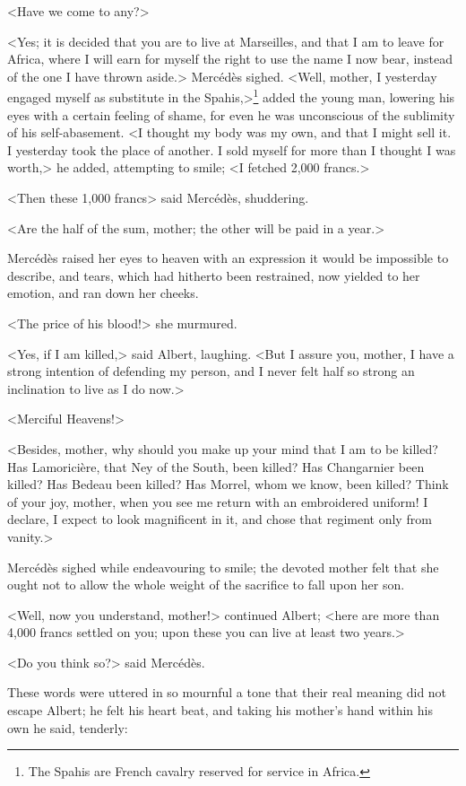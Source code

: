  <Have we come to any?> 

 <Yes; it is decided that you are to live at Marseilles, and that I am to leave for Africa, where I will earn for myself the right to use the name I now bear, instead of the one I have thrown aside.> Mercédès sighed. <Well, mother, I yesterday engaged myself as substitute in the Spahis,>\footnote{The Spahis are French cavalry reserved for service in Africa. } added the young man, lowering his eyes with a certain feeling of shame, for even he was unconscious of the sublimity of his self-abasement. <I thought my body was my own, and that I might sell it. I yesterday took the place of another. I sold myself for more than I thought I was worth,> he added, attempting to smile; <I fetched 2,000 francs.> 

 <Then these 1,000 francs\longdash> said Mercédès, shuddering. 

 <Are the half of the sum, mother; the other will be paid in a year.> 

 Mercédès raised her eyes to heaven with an expression it would be impossible to describe, and tears, which had hitherto been restrained, now yielded to her emotion, and ran down her cheeks. 

 <The price of his blood!> she murmured. 

 <Yes, if I am killed,> said Albert, laughing. <But I assure you, mother, I have a strong intention of defending my person, and I never felt half so strong an inclination to live as I do now.> 

 <Merciful Heavens!> 

 <Besides, mother, why should you make up your mind that I am to be killed? Has Lamoricière, that Ney of the South, been killed? Has Changarnier been killed? Has Bedeau been killed? Has Morrel, whom we know, been killed? Think of your joy, mother, when you see me return with an embroidered uniform! I declare, I expect to look magnificent in it, and chose that regiment only from vanity.> 

 Mercédès sighed while endeavouring to smile; the devoted mother felt that she ought not to allow the whole weight of the sacrifice to fall upon her son. 

 <Well, now you understand, mother!> continued Albert; <here are more than 4,000 francs settled on you; upon these you can live at least two years.> 

 <Do you think so?> said Mercédès. 

 These words were uttered in so mournful a tone that their real meaning did not escape Albert; he felt his heart beat, and taking his mother's hand within his own he said, tenderly: 


